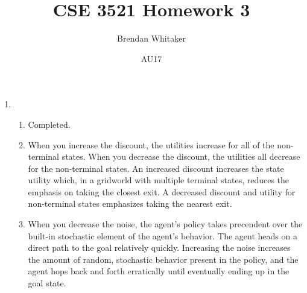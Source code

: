 \documentclass[10pt,oneside,reqno]{amsart}
\theoremstyle{plain}
\theoremstyle{definition}
\begin{document}
\title{CSE 3521 Homework 3}

\date{AU17}

\author[Brendan Whitaker]{Brendan Whitaker}

\maketitle

\begin{enumerate}[label=\arabic*.]

\item 

\begin{enumerate}

\item Completed. 

\item When you increase the discount, the utilities increase for all of the non-terminal states. When you decrease the discount, the utilities all decrease for the non-terminal states. An increased discount increases the state utility which, in a gridworld with multiple terminal states, reduces the emphasis on taking the closest exit. A decreased discount and utility for non-terminal states emphasizes taking the nearest exit. 

\item When you decrease the noise, the agent's policy takes precendent over the built-in stochastic element of the agent's behavior. The agent heads on a direct path to the goal relatively quickly. Increasing the noise increases the amount of random, stochastic behavior present in the policy, and the agent hops back and forth erratically until eventually ending up in the goal state. 

\end{enumerate}


\end{enumerate}
\end{document}
